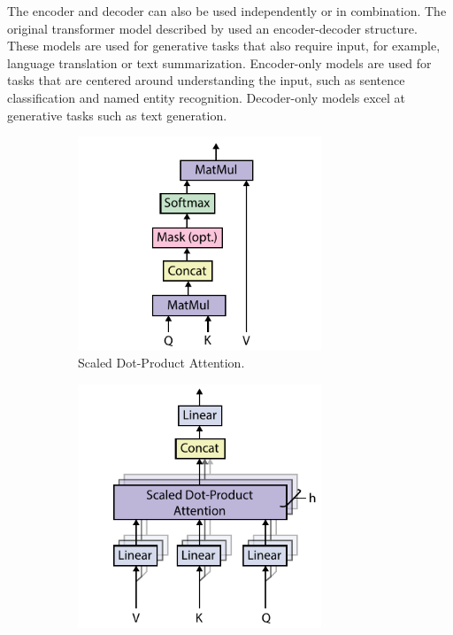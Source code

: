 The encoder and decoder can also be used independently or in combination. The original transformer model described by \textcite{vaswani2017attention} used an encoder-decoder structure. These models are used for generative tasks that also require input, for example, language translation or text summarization. Encoder-only models are used for tasks that are centered around understanding the input, such as sentence classification and named entity recognition. Decoder-only models excel at generative tasks such as text generation.

\begin{figure}[htp]
    \centering
    \begin{subfigure}[b]{0.5\textwidth}
        \centering
        \includegraphics[width=0.8\textwidth,keepaspectratio]{figures/scaled_dot-product_attention.pdf}
        \caption{Scaled Dot-Product Attention.}
        \label{fig:scaled-dotproduct-attention}
    \end{subfigure}%
    \hfill
    \begin{subfigure}[b]{0.5\textwidth}
        \centering
        \includegraphics[width=0.8\textwidth,keepaspectratio]{figures/multi-head_attention.pdf}

\end{subfigure}
\end{figure}
